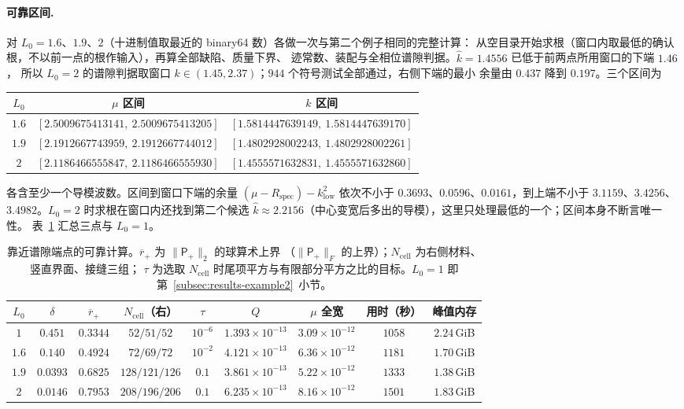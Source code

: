 \paragraph{可靠区间.}
对 $L_0=1.6$、$1.9$、$2$（十进制值取最近的 binary64 数）各做一次与第二个例子相同的完整计算：
从空目录开始求根（窗口内取最低的确认根，不以前一点的根作输入），再算全部缺陷、质量下界、
迹常数、装配与全相位谱隙判据。$\widehat k=1.4556$ 已低于前两点所用窗口的下端 $1.46$，
所以 $L_0=2$ 的谱隙判据取窗口 $k\in(1.45,2.37)$；$944$ 个符号测试全部通过，右侧下端的最小
余量由 $0.437$ 降到 $0.197$。三个区间为
\begin{center}
  \begin{tabular}{ccc}
    \toprule
    $L_0$ & $\mu$ 区间 & $k$ 区间\\
    \midrule
    $1.6$ & $[2.5009675413141,\ 2.5009675413205]$ & $[1.5814447639149,\ 1.5814447639170]$\\
    $1.9$ & $[2.1912667743959,\ 2.1912667744012]$ & $[1.4802928002243,\ 1.4802928002261]$\\
    $2$   & $[2.1186466555847,\ 2.1186466555930]$ & $[1.4555571632831,\ 1.4555571632860]$\\
    \bottomrule
  \end{tabular}
\end{center}
各含至少一个导模波数。区间到窗口下端的余量
$(\mu-R_{\mathrm{spec}})-k_{\mathrm{low}}^2$ 依次不小于 $0.3693$、$0.0596$、$0.0161$，到上端不小于
$3.1159$、$3.4256$、$3.4982$。$L_0=2$ 时求根在窗口内还找到第二个候选
$\widehat k\approx2.2156$（中心变宽后多出的导模），这里只处理最低的一个；区间本身不断言唯一性。
表~\ref{tab:results-gapedge} 汇总三点与 $L_0=1$。
\begin{table}[htbp]
  \centering
  \caption{靠近谱隙端点的可靠计算。$\overline r_+$ 为 $\lVert\mathsf P_+\rVert_2$ 的球算术上界
  （$\lVert\mathsf P_+\rVert_F$ 的上界）；$N_{\mathrm{cell}}$ 为右侧材料、竖直界面、接缝三组；
  $\tau$ 为选取 $N_{\mathrm{cell}}$ 时尾项平方与有限部分平方之比的目标。$L_0=1$ 即
  第~\ref{subsec:results-example2}~小节。}
  \label{tab:results-gapedge}
  \footnotesize
  \setlength{\tabcolsep}{3pt}
  \begin{tabular}{ccccccccc}
    \toprule
    $L_0$ & $\delta$ & $\overline r_+$ & $N_{\mathrm{cell}}$（右） & $\tau$ & $Q$ & $\mu$ 全宽 & 用时（秒） & 峰值内存\\
    \midrule
    $1$   & $0.451$  & $0.3344$ & $52/51/52$    & $10^{-6}$ & $1.393\times10^{-13}$ & $3.09\times10^{-12}$ & $1058$ & $2.24$\,GiB\\
    $1.6$ & $0.140$  & $0.4924$ & $72/69/72$    & $10^{-2}$ & $4.121\times10^{-13}$ & $6.36\times10^{-12}$ & $1181$ & $1.70$\,GiB\\
    $1.9$ & $0.0393$ & $0.6825$ & $128/121/126$ & $0.1$     & $3.861\times10^{-13}$ & $5.22\times10^{-12}$ & $1333$ & $1.38$\,GiB\\
    $2$   & $0.0146$ & $0.7953$ & $208/196/206$ & $0.1$     & $6.235\times10^{-13}$ & $8.16\times10^{-12}$ & $1501$ & $1.83$\,GiB\\
    \bottomrule
  \end{tabular}
\end{table}

